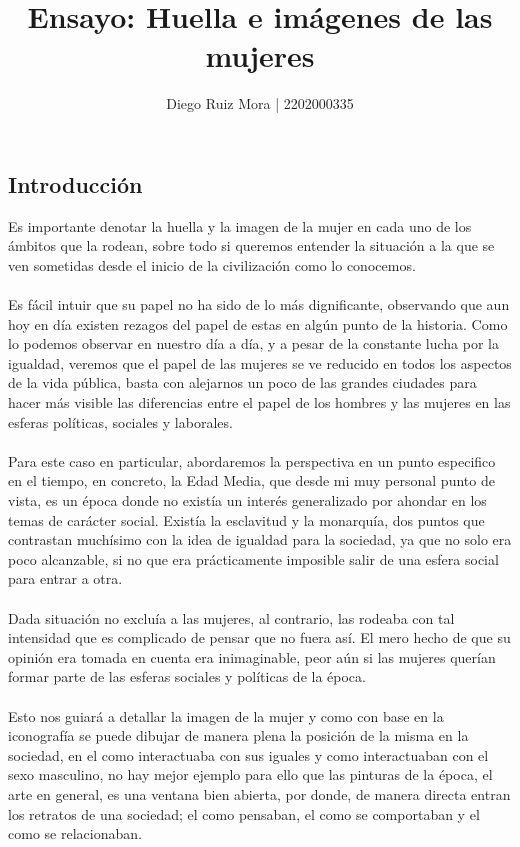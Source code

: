 \documentclass{report}
\title{Ensayo: Huella e imágenes de las mujeres}
\author{Diego Ruiz Mora | 2202000335}
\begin{document}
\maketitle
\newpage
\subsection{Introducción}
\bigskip
Es importante denotar la huella y la imagen de la mujer en cada uno de los ámbitos que la rodean, sobre todo si queremos entender la situación a la que se ven sometidas desde el inicio de la civilización como lo conocemos. 
\\\\
Es fácil intuir que su papel no ha sido de lo más dignificante, observando que aun hoy en día existen rezagos del papel de estas en algún punto de la historia. Como lo podemos observar en nuestro día a día, y a pesar de la constante lucha por la igualdad,  veremos que el papel de las mujeres se ve reducido en todos los aspectos de la vida pública, basta con alejarnos un poco de las grandes ciudades para hacer más visible las diferencias entre el papel de los hombres y las mujeres en las esferas políticas, sociales y laborales. 
\\\\
Para este caso en particular, abordaremos la perspectiva en un punto especifico en el tiempo, en concreto, la Edad Media, que desde mi muy personal punto de vista, es un época donde no existía un interés generalizado por ahondar en los temas de carácter social. 
Existía la esclavitud y la monarquía, dos puntos que contrastan muchísimo con la idea de igualdad para la sociedad, ya que no solo era poco alcanzable, si no que era prácticamente imposible salir de una esfera social para entrar a otra. 
\\\\
Dada situación no excluía a las mujeres, al contrario, las rodeaba con tal intensidad que es complicado de pensar que no fuera así. El mero hecho de que su opinión era tomada en cuenta era inimaginable, peor aún si las mujeres querían formar parte de las esferas sociales y políticas de la época. 
\\\\
Esto nos guiará a detallar la imagen de la mujer y como con base en la iconografía se puede dibujar de manera plena la posición de la misma en la sociedad, en el como interactuaba con sus iguales y como interactuaban con el sexo masculino, no hay mejor ejemplo para ello que las pinturas de la época, el arte en general, es una ventana bien abierta, por donde, de manera directa entran los retratos de una sociedad; el como pensaban, el como se comportaban y el como se relacionaban. 
\end{document}
